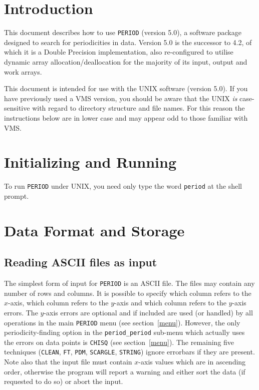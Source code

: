 \documentclass[twoside,11pt,noabs,nolof]{starlink}
\begin{document}
\scfrontmatter

\section{Introduction}

This document describes how to use \texttt{PERIOD} (version 5.0), a
software package designed to search for periodicities in data.
Version 5.0 is the successor to 4.2, of which
it is a Double Precision implementation, also re-configured to utilise
dynamic array allocation/deallocation for the majority of its input,
output and work arrays.

This document is intended for use with the UNIX software (version
5.0). If you have previously used a VMS version, you should be aware
that the UNIX \emph{is} case-sensitive with regard to directory
structure and file names.  For this reason the instructions below are
in lower case and may appear odd to those familiar with VMS.

\section{Initializing and Running}

To run \texttt{PERIOD} under UNIX, you need only type the word \texttt{period} at the shell prompt.

\section{Data Format and Storage}
\label{slots}

\subsection{Reading ASCII files as input}
\label{slots1}

The simplest form of input for \texttt{PERIOD} is an ASCII file.  The
files may contain any number of rows and columns. It is possible to
specify which column refers to the $x$-axis, which column refers to
the $y$-axis and which column refers to the $y$-axis errors.
The $y$-axis errors are optional and if included are used (or handled)
by all operations in the main \texttt{PERIOD} menu (see
section~\ref{menu}).  However, the only periodicity-finding option in
the \texttt{period\_period} sub-menu which actually uses the errors on
data points is \texttt{CHISQ} (see section~\ref{menu}). The remaining five
techniques (\texttt{CLEAN}, \texttt{FT}, \texttt{PDM}, \texttt{SCARGLE}, \texttt{STRING}) ignore errorbars if they are present. Note also that the input
file must contain $x$-axis values which are in ascending order,
otherwise the program will report a warning and either sort the data
(if requested to do so) or abort the input.
\end{document}
